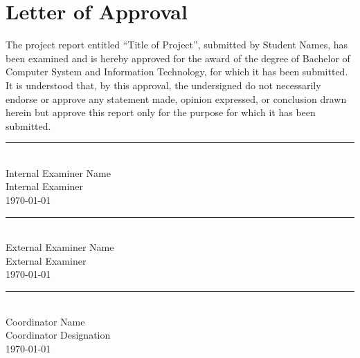 \chapter*{Letter of Approval}

The project report entitled ``{Title of Project}'', submitted by {Student Names}, has been examined and is hereby approved for the award of the degree of Bachelor of Computer System and Information Technology, for which it has been submitted. It is understood that, by this approval, the undersigned do not necessarily endorse or approve any statement made, opinion expressed, or conclusion drawn herein but approve this report only for the purpose for which it has been submitted. 

\vspace{2cm}
\noindent

\begin{minipage}[t]{0.32\textwidth}
    \rule{4.5cm}{0.4pt}\\[2mm]
    {Internal Examiner Name}\\
    Internal Examiner\\
    \today
\end{minipage}%
\hfill
\begin{minipage}[t]{0.32\textwidth}
    \rule{4.5cm}{0.4pt}\\[2mm]
    {External Examiner Name}\\
    External Examiner\\
    \today
\end{minipage}%
\hfill
\begin{minipage}[t]{0.32\textwidth}
    \rule{4.5cm}{0.4pt}\\[2mm]
    {Coordinator Name}\\
    {Coordinator Designation}\\
    \today
\end{minipage}
